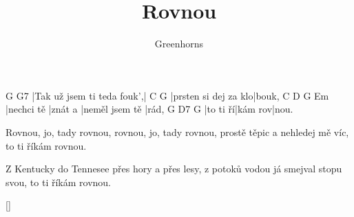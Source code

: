 \documentclass{song}
\title{Rovnou}
\author{Greenhorns}
\begin{document}
\strophe
G                          G7
|Tak už jsem ti teda fouk',|
C                    G
|prsten si dej za klo|bouk,
C          D       G              Em
|nechci tě |znát a |neměl jsem tě |rád,
G        D7     G
|to ti ří|kám rov|nou.
\endstrophe

Rovnou, jo, tady rovnou,
rovnou, jo, tady rovnou,
prostě těpic a nehledej mě víc,
to ti říkám rovnou.
\endstrophe

\strophe*
Z Kentucky do Tennesee
přes hory a přes lesy,
z potoků vodou já smejval stopu svou,
to ti říkám rovnou.
\endstrophe

\ref{}
\end{document}
